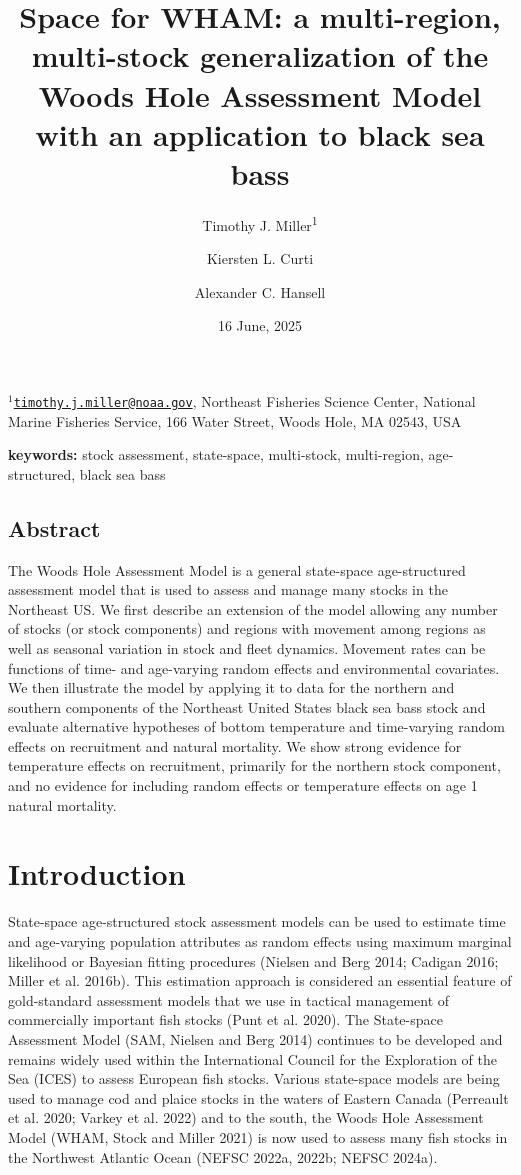 \documentclass[
]{article}
\title{Space for WHAM: a multi-region, multi-stock generalization of the Woods Hole Assessment Model with an application to black sea bass}
\author{Timothy J. Miller\textsuperscript{1} \and Kiersten L. Curti \and Alexander C. Hansell}
\date{16 June, 2025}
\begin{document}
\maketitle

\(^1\)\href{mailto:timothy.j.miller@noaa.gov}{\nolinkurl{timothy.j.miller@noaa.gov}}, Northeast Fisheries Science Center, National Marine Fisheries Service, 166 Water Street, Woods Hole, MA 02543, USA\\

\pagebreak

\textbf{keywords:} stock assessment, state-space, multi-stock, multi-region, age-structured, black sea bass

\hypertarget{abstract}{%
\subsection*{Abstract}\label{abstract}}

The Woods Hole Assessment Model is a general state-space age-structured assessment model that is used to assess and manage many stocks in the Northeast US. We first describe an extension of the model allowing any number of stocks (or stock components) and regions with movement among regions as well as seasonal variation in stock and fleet dynamics. Movement rates can be functions of time- and age-varying random effects and environmental covariates. We then illustrate the model by applying it to data for the northern and southern components of the Northeast United States black sea bass stock and evaluate alternative hypotheses of bottom temperature and time-varying random effects on recruitment and natural mortality. We show strong evidence for temperature effects on recruitment, primarily for the northern stock component, and no evidence for including random effects or temperature effects on age 1 natural mortality.

\pagebreak

\hypertarget{introduction}{%
\section*{Introduction}\label{introduction}}

State-space age-structured stock assessment models can be used to estimate time and age-varying population attributes as random effects using maximum marginal likelihood or Bayesian fitting procedures (Nielsen and Berg 2014; Cadigan 2016; Miller et al. 2016b). This estimation approach is considered an essential feature of gold-standard assessment models that we use in tactical management of commercially important fish stocks (Punt et al. 2020). The State-space Assessment Model (SAM, Nielsen and Berg 2014) continues to be developed and remains widely used within the International Council for the Exploration of the Sea (ICES) to assess European fish stocks. Various state-space models are being used to manage cod and plaice stocks in the waters of Eastern Canada (Perreault et al. 2020; Varkey et al. 2022) and to the south, the Woods Hole Assessment Model (WHAM, Stock and Miller 2021) is now used to assess many fish stocks in the Northwest Atlantic Ocean (NEFSC 2022a, 2022b; NEFSC 2024a).
\end{document}
